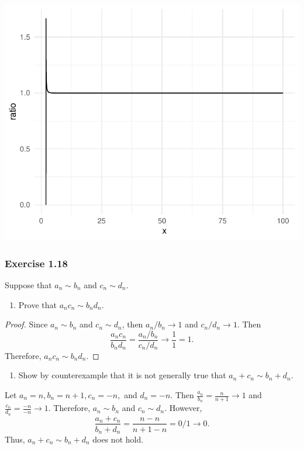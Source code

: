 \documentclass[12pt,]{article}
\providecommand{\tightlist}{%
  \setlength{\itemsep}{0pt}\setlength{\parskip}{0pt}}
\begin{document}
\begin{center}\includegraphics{Homework1_files/figure-latex/exe_1.15b-1} \end{center}

\hypertarget{exercise-1.18}{%
\subsubsection{Exercise 1.18}\label{exercise-1.18}}

Suppose that \(a_n \sim b_n\) and \(c_n \sim d_n\).

\begin{enumerate}
\def\labelenumi{\alph{enumi}.}
\tightlist
\item
  Prove that \(a_nc_n \sim b_nd_n.\)
\end{enumerate}

\begin{proof}
Since $a_n \sim b_n$ and $c_n \sim d_n$, then $a_n/b_n \rightarrow 1$ and $c_n/d_n \rightarrow 1$. Then $$\frac{a_nc_n}{b_nd_n} = \frac{a_n/b_n}{c_n/d_n}\rightarrow \frac{1}{1} = 1.$$ Therefore, $a_nc_n \sim b_nd_n.$
\end{proof}

\begin{enumerate}
\def\labelenumi{\alph{enumi}.}
\setcounter{enumi}{1}
\tightlist
\item
  Show by counterexample that it is not generally true that
  \(a_n + c_n \sim b_n + d_n.\)
\end{enumerate}

Let \(a_n = n, b_n = n + 1, c_n = -n,\) and \(d_n = -n.\) Then
\(\frac{a_n}{b_n} = \frac{n}{n+1} \rightarrow 1\) and
\(\frac{c_n}{d_n} = \frac{-n}{-n} \rightarrow 1.\) Therefore,
\(a_n \sim b_n\) and \(c_n \sim d_n\). However,
\[\frac{a_n + c_n}{b_n + d_n}=\frac{n-n}{n+1-n} = 0/1 \rightarrow 0.\]
Thus, \(a_n + c_n \sim b_n + d_n\) does not hold.
\end{document}
